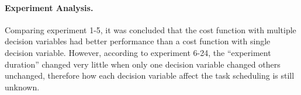 \paragraph{Experiment Analysis.} 
Comparing experiment 1-5, it was concluded that the cost function with multiple decision variables had better performance than a cost function with single decision variable. However, according to experiment 6-24, the ``experiment duration'' changed very little when only one decision variable changed others unchanged, therefore how each decision variable affect the task scheduling is still unknown.

\begin{table}[htb]
\centering
{}
\caption{Running execute task with single decision variable and multiple decision variables.}
\label{tab:exp_decision_variables}
\end{table}


